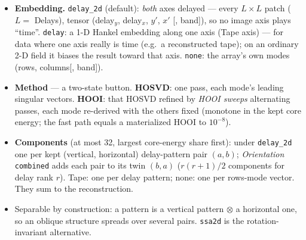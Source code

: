 \documentclass[10pt]{article}
\newcommand{\dev}[1]{\texttt{#1}}
\begin{document}
\begin{itemize}\itemsep2pt
  \item \textbf{Embedding.} \texttt{delay\_2d} (default): \emph{both} axes delayed ---
        every $L\times L$ patch ($L=$ Delays), tensor (delay$_y$, delay$_x$, $y'$, $x'$
        [, band]), so no image axis plays ``time''.
        \texttt{delay}: a 1-D Hankel embedding along one axis (Tape axis) --- for data where
        one axis really is time (e.g.\ a reconstructed tape); on an ordinary 2-D field it
        biases the result toward that axis. \texttt{none}: the array's own modes (rows,
        columns[, band]).
  \item \textbf{Method} --- a two-state button. \textbf{HOSVD}: one pass, each mode's leading
        singular vectors. \textbf{HOOI}: that HOSVD refined by \emph{HOOI sweeps} alternating
        passes, each mode re-derived with the others fixed (monotone in the kept core
        energy; the fast path equals a materialized HOOI to $10^{-8}$).
  \item \textbf{Components} (at most 32, largest core-energy share first): under
        \texttt{delay\_2d} one per kept (vertical, horizontal) delay-pattern pair $(a,b)$;
        \emph{Orientation} \texttt{combined} adds each pair to its twin $(b,a)$
        ($r(r+1)/2$ components for delay rank $r$). Tape: one per delay pattern; none: one per
        rows-mode vector. They sum to the reconstruction.
  \item Separable by construction: a pattern is a vertical pattern $\otimes$ a horizontal one,
        so an oblique structure spreads over several pairs. \dev{ssa2d} is the
        rotation-invariant alternative.
\end{itemize}
\end{document}
